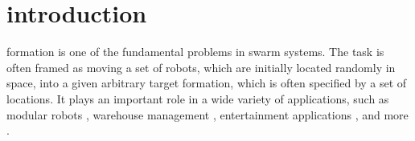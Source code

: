 \documentclass[journal]{IEEEtran}
\begin{document}
\section{introduction}

 formation is one of the fundamental problems in swarm systems. The task is often framed as moving a set of robots, which are initially located randomly in space, into a given arbitrary target formation, which is often specified by a set of locations. It plays an important role in a wide variety of applications, such as modular robots \cite{ex1},  warehouse management \cite{ex2}, entertainment
applications \cite{am}, and more \cite{rss2019}. 

\captionsetup[subfloat]{labelformat=empty}
\begin{figure}[t!]
 \centering
{}\hfill
{}\hfill
{}
\\
\vskip -10pt
\centering
{}\hfill
{}\hfill

\end{figure}
\end{document}
